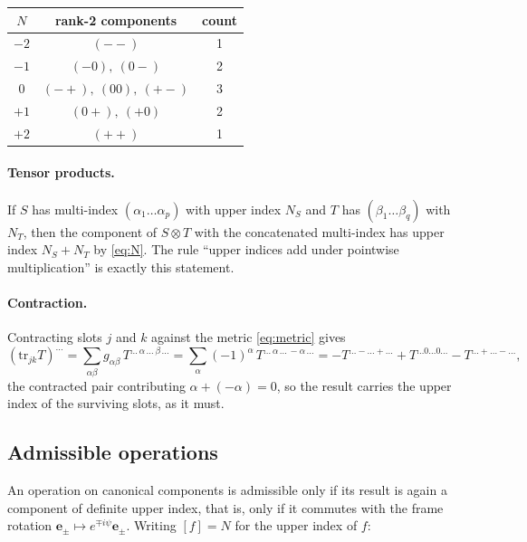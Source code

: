 \documentclass[11pt,a4paper]{article}
\newcommand{\ebasis}[1]{\mathbf{e}_{#1}}
\begin{document}
\begin{center}
  \begin{tabular}{ccc}
    \toprule
    $N$ & rank-2 components & count \\
    \midrule
    $-2$ & $(--)$ & 1 \\
    $-1$ & $(-0),\ (0-)$ & 2 \\
    $ 0$ & $(-+),\ (00),\ (+-)$ & 3 \\
    $+1$ & $(0+),\ (+0)$ & 2 \\
    $+2$ & $(++)$ & 1 \\
    \bottomrule
  \end{tabular}
\end{center}

\paragraph{Tensor products.}  If $S$ has multi-index
$(\alpha_1\ldots\alpha_p)$ with upper index $N_S$ and $T$ has
$(\beta_1\ldots\beta_q)$ with $N_T$, then the component of $S\otimes T$
with the concatenated multi-index has upper index $N_S+N_T$ by
\eqref{eq:N}.  The rule ``upper indices add under pointwise
multiplication'' is exactly this statement.

\paragraph{Contraction.}  Contracting slots $j$ and $k$ against the
metric \eqref{eq:metric} gives
\begin{equation}
  \left(\mathrm{tr}_{jk} T\right)^{\ldots}
    = \sum_{\alpha\beta} g_{\alpha\beta}\,
      T^{\ldots\,\alpha\,\ldots\,\beta\,\ldots}
    = \sum_{\alpha}(-1)^{\alpha}\,T^{\ldots\,\alpha\,\ldots\,-\alpha\,\ldots}
    = -T^{\ldots -\ldots +\ldots} + T^{\ldots 0\ldots 0\ldots}
      - T^{\ldots +\ldots -\ldots},
  \label{eq:contract}
\end{equation}
the contracted pair contributing $\alpha+(-\alpha)=0$, so the result
carries the upper index of the surviving slots, as it must.

\subsection{Admissible operations}
\label{sec:algebra}

An operation on canonical components is admissible only if its result is
again a component of definite upper index, that is, only if it commutes
with the frame rotation $\ebasis{\pm}\mapsto e^{\mp i\psi}\ebasis{\pm}$.
Writing $[f]=N$ for the upper index of $f$:
\end{document}
